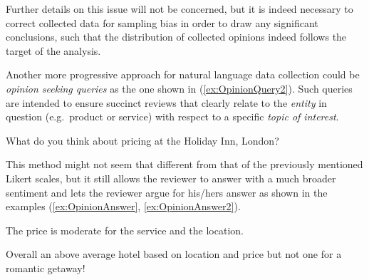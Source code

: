 Further details on this issue will not be concerned, but it is indeed necessary to correct collected data for sampling bias in order to draw any significant conclusions, such that the distribution of collected opinions indeed follows the target of the analysis.

Another more progressive approach for natural language data collection could be \emph{opinion seeking queries} as the one shown in (\ref{ex:OpinionQuery2}). Such queries are intended to ensure succinct reviews that clearly relate to the \emph{entity} in question (e.g.\ product or service) with respect to a specific \emph{topic of interest}.
\begin{numquote}
	What do you think about pricing at the Holiday Inn, London?
	\label{ex:OpinionQuery2}
\end{numquote}

This method might not seem that different from that of the previously mentioned Likert scales, but it still allows the reviewer to answer with a much broader sentiment and lets the reviewer argue for his/hers answer as shown in the examples (\ref{ex:OpinionAnswer}, \ref{ex:OpinionAnswer2}).
\begin{numquote}
	The price is moderate for the service and the location.
	\label{ex:OpinionAnswer}
\end{numquote}
\begin{numquote}
	Overall an above average hotel based on location and price   but not one for a romantic getaway!
	\label{ex:OpinionAnswer2}
\end{numquote}

